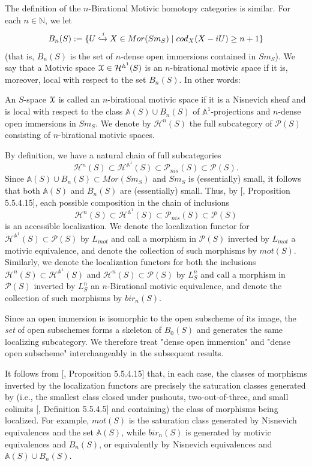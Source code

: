 The definition of the $n$-Birational Motivic homotopy categories is similar. For each $n\in \mathbb{N}$, we let $$B_n(S):=\{U\xhookrightarrow{i} X \in Mor(Sm_S)\mid cod_X(X-iU)\geq n+1\}$$ (that is, $B_n(S)$ is the set of $n$-dense open immersions contained in $Sm_S$). We say that a Motivic space $\EuScript{X}\in\mathcal{H}^{\mathbb{A}^1}(S)$ is an $n$-birational motivic space if it is, moreover, local with respect to the set $B_n(S)$. In other words:
\begin{defn}
    An $S$-space $\EuScript{X}$ is called an $n$-birational motivic space if it is a Nisnevich sheaf and is local with respect to the class $\mathbb{A}(S)\cup B_n(S)$ of $\mathbb{A}^1$-projections and $n$-dense open immersions in $Sm_S$. We denote by $\mathcal{H} ^{n}(S)$ the full subcategory of $\mathcal{P}(S)$ consisting of $n$-birational motivic spaces.
\end{defn}

By definition, we have a natural chain of full subcategories $$\mathcal{H}^n(S)\subset \mathcal{H}^{\mathbb{A}^1}(S)\subset \mathcal{P}_{nis}(S)\subset \mathcal{P}(S).$$ Since $\mathbb{A}(S)\cup B_n(S)\subset Mor(Sm_S)$ and $Sm_S$ is (essentially) small, it follows that both $\mathbb{A}(S)$ and $B_n(S)$ are (essentially) small. Thus, by [\cite{lurie2009higher}, Proposition 5.5.4.15], each possible composition in the chain of inclusions $$\mathcal{H}^n(S)\subset \mathcal{H}^{\mathbb{A}^1}(S)\subset \mathcal{P}_{nis}(S)\subset \mathcal{P}(S)$$ is an accessible localization. We denote the localization functor for $\mathcal{H}^{\mathbb{A}^1}(S)\subset \mathcal{P}(S)$ by $L_{mot}$ and call a morphism in $\mathcal{P}(S)$ inverted by $L_{mot}$ a motivic equivalence, and denote the collection of such morphisms by $mot(S)$. Similarly, we denote the localization functors for both the inclusions $\mathcal{H}^n(S)\subset \mathcal{H}^{\mathbb{A}^1}(S)$ and $\mathcal{H}^n(S)\subset \mathcal{P}(S)$ by $L^n_S$ and call a morphism in $\mathcal{P}(S)$ inverted by $L^n_S$ an $n$-Birational motivic equivalence, and denote the collection of such morphisms by $bir_n(S)$. 
\begin{rem}
    Since an open immersion is isomorphic to the open subscheme of its image, the \textit{set} of open subschemes forms a skeleton of $B_0(S)$ and generates the same localizing subcategory. We therefore treat "dense open immersion" and "dense open subscheme" interchangeably in the subsequent results.
\end{rem}

It follows from [\cite{lurie2009higher}, Proposition 5.5.4.15] that, in each case, the classes of morphisms inverted by the localization functors are precisely the saturation classes generated by (i.e., the smallest class closed under pushouts, two-out-of-three, and small colimits [\cite{lurie2009higher}, Definition 5.5.4.5] and containing) the class of morphisms being localized. For example, $mot(S)$ is the saturation class generated by Nisnevich equivalences and the set $\mathbb{A}(S)$, while $bir_n(S)$ is generated by motivic equivalences and $B_n(S)$, or equivalently by Nisnevich equivalences and $\mathbb{A}(S)\cup B_n(S)$.

